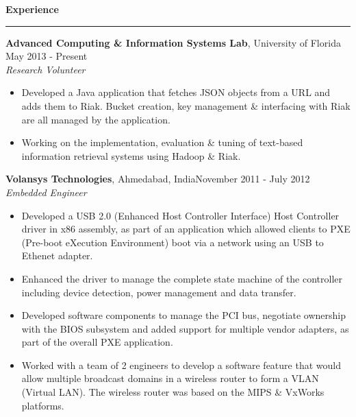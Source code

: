 \documentclass[10pt, a4paper]{article}
\begin{document}
\textbf{Experience}
\smallskip
\hrule
{\bf Advanced Computing \& Information Systems Lab}, University of Florida \hfill May 2013 - Present\\
\textit{Research Volunteer}
\begin{itemize}
    \item Developed a Java application that fetches JSON objects from a URL and adds them to Riak. Bucket creation, key management \& interfacing with Riak are all managed by the application. %
    \item Working on the implementation, evaluation \& tuning of text-based information retrieval systems using Hadoop \& Riak.%
\end{itemize}
{\bf Volansys Technologies}, Ahmedabad, India\hfill November 2011 - July 2012\\
\textit{Embedded Engineer}
\begin{itemize}
    \item Developed a USB 2.0 (Enhanced Host Controller Interface) Host Controller driver in x86 assembly, as part of an application which allowed clients to PXE (Pre-boot eXecution Environment) boot via a network using an USB to Ethenet adapter. 
    \item Enhanced the driver to manage the complete state machine of the controller including device detection, power management and data transfer. %
    \item Developed software components to manage the PCI bus, negotiate ownership with the BIOS subsystem and added support for multiple vendor adapters, as part of the overall PXE application. %
    \item Worked with a team of 2 engineers to develop a software feature that would allow multiple broadcast domains in a wireless router to form a VLAN (Virtual LAN). The wireless router was based on the MIPS \& VxWorks platforms.
\end{itemize}
\end{document}
